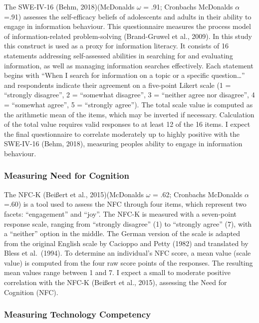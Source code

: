 \documentclass[
  12pt,
  a4paper,
  twoside]{article}
\begin{document}
The SWE-IV-16 (Behm, 2018)(McDonalds \(\omega\) = .91; Cronbachs McDonalds \(\alpha\) =.91) assesses the self-efficacy beliefs
of adolescents and adults in their ability to engage in information behaviour. This
questionnaire measures the process model of information-related problem-solving
(Brand-Gruwel et al., 2009). In this study this construct is used as a proxy for information literacy.
It consists of 16 statements addressing self-assessed
abilities in searching for and evaluating information, as well as managing
information searches effectively. Each statement begins with ``When I search for
information on a topic or a specific question\ldots{}'' and respondents indicate their
agreement on a five-point Likert scale (1 = ``strongly disagree'', 2 = ``somewhat
disagree'', 3 = ``neither agree nor disagree'', 4 = ``somewhat agree'', 5 = ``strongly
agree''). The total scale value is computed as the arithmetic
mean of the items, which may be inverted if necessary. Calculation of the total value
requires valid responses to at least 12 of the 16 items. I expect the final questionnaire to correlate moderately up to highly positive with the SWE-IV-16 (Behm, 2018), measuring peoples ability to engage in information behaviour.

\subsubsection{Measuring Need for Cognition}\label{measuring-need-for-cognition}

The NFC-K (Beißert et al., 2015)(McDonalds \(\omega\) = .62; Cronbachs McDonalds \(\alpha\) =.60) is a tool used to assess the
NFC through four items, which represent two facets: ``engagement'' and ``joy''. The
NFC-K is measured with a seven-point response scale, ranging from ``strongly
disagree'' (1) to ``strongly agree'' (7), with a ``neither'' option in the middle. The
German version of the scale is adapted from the original English scale by Cacioppo
and Petty (1982) and translated by Bless et al.~(1994). To determine an individual's NFC score, a mean value
(scale value) is computed from the four raw score points of the responses. The
resulting mean values range between 1 and 7. I expect a small to moderate positive correlation with the NFC-K (Beißert et al., 2015), assessing the Need for Cognition (NFC).

\subsubsection{Measuring Technology Competency}\label{measuring-technology-competency}
\end{document}
